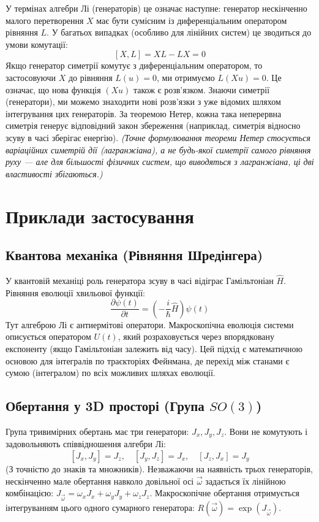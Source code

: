 \documentclass[12pt, a4paper]{article}
\begin{document}
	У термінах алгебри Лі (генераторів) це означає наступне: генератор нескінченно малого перетворення $X$ має бути сумісним із диференціальним оператором рівняння $L$. У багатьох випадках (особливо для лінійних систем) це зводиться до умови комутації:
	\[ [X, L] = X L - L X = 0 \]
	Якщо генератор симетрії комутує з диференціальним оператором, то застосовуючи $X$ до рівняння $L(u)=0$, ми отримуємо $L(X u) = 0$. Це означає, що нова функція $(X u)$ також є розв'язком. 
	Знаючи симетрії (генератори), ми можемо знаходити нові розв'язки з уже відомих шляхом інтегрування цих генераторів. За теоремою Нетер, кожна така неперервна симетрія генерує відповідний закон збереження (наприклад, симетрія відносно зсуву в часі зберігає енергію). \textit{(Точне формулювання теореми Нетер стосується варіаційних симетрій дії (лагранжіана), а не будь-якої симетрії самого рівняння руху — але для більшості фізичних систем, що виводяться з лагранжіана, ці дві властивості збігаються.)}
	
	\section{Приклади застосування}
	
	\subsection{Квантова механіка (Рівняння Шредінгера)}
	У квантовій механіці роль генератора зсуву в часі відіграє Гамільтоніан $\hat{H}$. Рівняння еволюції хвильової функції:
	\[ \frac{\partial \psi(t)}{\partial t} = \left(-\frac{i}{\hbar}\hat{H}\right) \psi(t) \]
	Тут алгеброю Лі є антиермітові оператори. Макроскопічна еволюція системи описується оператором $U(t)$, який розраховується через впорядковану експоненту (якщо Гамільтоніан залежить від часу). Цей підхід є математичною основою для інтегралів по траєкторіях Фейнмана, де перехід між станами є сумою (інтегралом) по всіх можливих шляхах еволюції.
	
	\subsection{Обертання у 3D просторі (Група $SO(3)$)}
	Група тривимірних обертань має три генератори: $J_x, J_y, J_z$. Вони не комутують і задовольняють співвідношення алгебри Лі:
	\[ [J_x, J_y] = J_z, \quad [J_y, J_z] = J_x, \quad [J_z, J_x] = J_y \]
	(З точністю до знаків та множників). Незважаючи на наявність трьох генераторів, нескінченно мале обертання навколо довільної осі $\vec{\omega}$ задається їх лінійною комбінацією: $J_{\vec{\omega}} = \omega_x J_x + \omega_y J_y + \omega_z J_z$. Макроскопічне обертання отримується інтегруванням цього одного сумарного генератора: $R(\vec{\omega}) = \exp(J_{\vec{\omega}})$.
	
\end{document}
